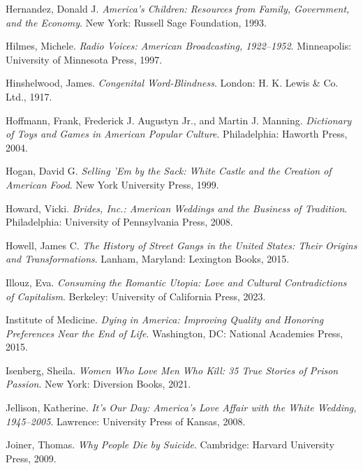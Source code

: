 \documentclass[
  american,
  letterpaper,
]{book}
\newlength{\cslhangindent}
\newenvironment{CSLReferences}[2] %
 {\begin{list}{}{%
  \setlength{\itemindent}{0pt}
  \setlength{\leftmargin}{0pt}
  \setlength{\parsep}{0pt}
  \ifodd #1
   \setlength{\leftmargin}{\cslhangindent}
   \setlength{\itemindent}{-1\cslhangindent}
  \fi
  \setlength{\itemsep}{#2\baselineskip}}}
 {\end{list}}
\begin{document}
\begin{CSLReferences}{1}{0}
Hernandez, Donald J. \emph{America's Children: Resources from Family,
Government, and the Economy}. New York: Russell Sage Foundation, 1993.

Hilmes, Michele. \emph{Radio Voices: American Broadcasting, 1922--1952}.
Minneapolis: University of Minnesota Press, 1997.

Hinshelwood, James. \emph{Congenital Word-Blindness}. London: H. K.
Lewis \& Co. Ltd., 1917.

Hoffmann, Frank, Frederick J. Augustyn Jr., and Martin J. Manning.
\emph{Dictionary of Toys and Games in American Popular Culture}.
Philadelphia: Haworth Press, 2004.

Hogan, David G. \emph{Selling 'Em by the Sack: White Castle and the
Creation of American Food}. New York University Press, 1999.

Howard, Vicki. \emph{Brides, Inc.: American Weddings and the Business of
Tradition}. Philadelphia: University of Pennsylvania Press, 2008.

Howell, James C. \emph{The History of Street Gangs in the United States:
Their Origins and Transformations}. Lanham, Maryland: Lexington Books,
2015.

Illouz, Eva. \emph{Consuming the Romantic Utopia: Love and Cultural
Contradictions of Capitalism}. Berkeley: University of California Press,
2023.

Institute of Medicine. \emph{Dying in America: Improving Quality and
Honoring Preferences Near the End of Life}. Washington, DC: National
Academies Press, 2015.

Isenberg, Sheila. \emph{Women Who Love Men Who Kill: 35 True Stories of
Prison Passion}. New York: Diversion Books, 2021.

Jellison, Katherine. \emph{It's Our Day: America's Love Affair with the
White Wedding, 1945--2005}. Lawrence: University Press of Kansas, 2008.

Joiner, Thomas. \emph{Why People Die by Suicide}. Cambridge: Harvard
University Press, 2009.


\end{CSLReferences}
\end{document}
